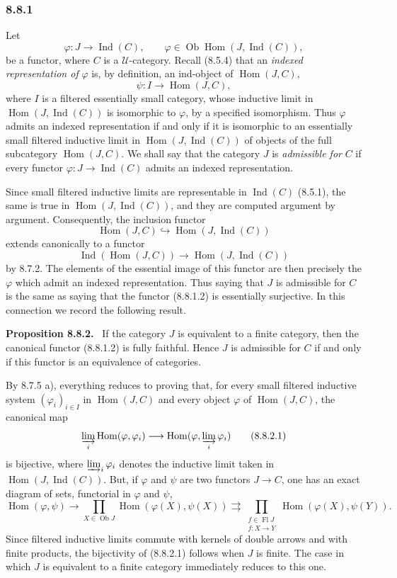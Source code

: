 \documentclass[11pt]{article}
\newcommand{\U}{\mathcal{U}}
\newcommand{\Ob}{\operatorname{Ob}}
\newcommand{\Hom}{\operatorname{Hom}}
\newcommand{\Fl}{\operatorname{Fl}}
\newcommand{\Ind}{\operatorname{Ind}}
\newcommand{\Hhom}{\operatorname{Hom}}
\newenvironment{statement}[1]{\par\medskip\noindent\textbf{#1.}\ }{\par\medskip}
\begin{document}
\subsubsection*{8.8.1}
Let
\[
 \varphi:J\longrightarrow \Ind(C),\qquad
 \varphi\in\Ob\Hhom(J,\Ind(C)),
\]
be a functor, where $C$ is a $\U$-category. Recall (8.5.4) that an \emph{indexed representation of} $\varphi$ is, by definition, an ind-object of $\Hhom(J,C)$,
\[
 \psi:I\longrightarrow \Hhom(J,C),
\]
where $I$ is a filtered essentially small category, whose inductive limit in $\Hhom(J,\Ind(C))$ is isomorphic to $\varphi$, by a specified isomorphism. Thus $\varphi$ admits an indexed representation if and only if it is isomorphic to an essentially small filtered inductive limit in $\Hhom(J,\Ind(C))$ of objects of the full subcategory $\Hhom(J,C)$. We shall say that the category $J$ is \emph{admissible for} $C$ if every functor $\varphi:J\to\Ind(C)$ admits an indexed representation.

Since small filtered inductive limits are representable in $\Ind(C)$ (8.5.1), the same is true in $\Hhom(J,\Ind(C))$, and they are computed argument by argument. Consequently, the inclusion functor
\[
 \Hhom(J,C)\hookrightarrow \Hhom(J,\Ind(C))
\tag{8.8.1.1}
\]
extends canonically to a functor
\[
 \Ind(\Hhom(J,C))\longrightarrow \Hhom(J,\Ind(C))
\tag{8.8.1.2}
\]
by 8.7.2. The elements of the essential image of this functor are then precisely the $\varphi$ which admit an indexed representation. Thus saying that $J$ is admissible for $C$ is the same as saying that the functor (8.8.1.2) is essentially surjective. In this connection we record the following result.

\begin{statement}{Proposition 8.8.2}
If the category $J$ is equivalent to a finite category, then the canonical functor (8.8.1.2) is fully faithful. Hence $J$ is admissible for $C$ if and only if this functor is an equivalence of categories.
\end{statement}

By 8.7.5 a), everything reduces to proving that, for every small filtered inductive system $(\varphi_i)_{i\in I}$ in $\Hhom(J,C)$ and every object $\varphi$ of $\Hhom(J,C)$, the canonical map
\[
 \varinjlim_i\Hom(\varphi,\varphi_i)\longrightarrow
 \Hom(\varphi,\varinjlim_i\varphi_i)
\tag{8.8.2.1}
\]
is bijective, where $\varinjlim_i\varphi_i$ denotes the inductive limit taken in $\Hhom(J,\Ind(C))$. But, if $\varphi$ and $\psi$ are two functors $J\to C$, one has an exact diagram of sets, functorial in $\varphi$ and $\psi$,
\[
\Hom(\varphi,\psi)\longrightarrow
\prod_{X\in\Ob J}\Hom(\varphi(X),\psi(X))
\rightrightarrows
\prod_{\substack{f\in\Fl J\\ f:X\to Y}}
\Hom(\varphi(X),\psi(Y)).
\]
Since filtered inductive limits commute with kernels of double arrows and with finite products, the bijectivity of (8.8.2.1) follows when $J$ is finite. The case in which $J$ is equivalent to a finite category immediately reduces to this one.
\end{document}
